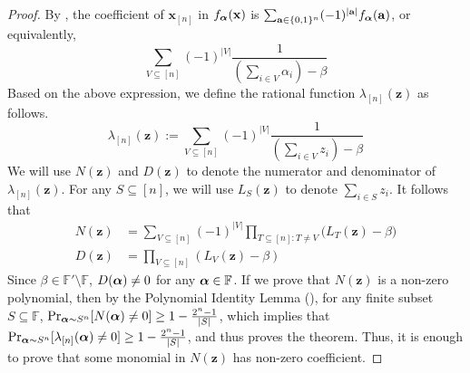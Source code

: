 \documentclass[11pt]{article}
\newcommand{\Boo}{\{0,1 \}}
\newcommand{\F}{\mathbb{F}}
\begin{document}
\begin{proof}
    By , the coefficient of $\mathbf{x}_{[n]}$ in $f_{\boldsymbol{\alpha}}(\mathbf{x})$ is $\sum_{\mathbf{a}\in\Boo^n} (-1)^{|\mathbf{a}|}f_{\bfalpha}(\mathbf{a})$, or equivalently, $$\sum_{V \subseteq [n]} (-1)^{|V|}{\frac{1}{(\sum_{i \in V}\alpha_i) - \beta}}$$
    Based on the above expression, we define the rational function $\lambda_{[n]}(\mathbf{z})$ as follows. 
    $$\lambda_{[n]}(\mathbf{z}) := \sum_{V \subseteq [n]} (-1)^{|V|}{\frac{1}{(\sum_{i \in V}z_i) - \beta}}$$
    We will use $N(\mathbf{z})$ and $D(\mathbf{z})$ to denote the numerator and denominator of $\lambda_{[n]}(\mathbf{z})$. For any $S\subseteq [n]$, we will use $L_S(\mathbf{z})$ to denote $\sum_{i \in S}z_i$. It follows that 
    \begin{align*}
        N(\mathbf{z}) &= \sum_{V\subseteq [n]}{(-1)^{|V|}\prod_{T\subseteq [n]: T \neq V}({L_T(\mathbf{z})-\beta}}) \\
        D(\mathbf{z}) &= \prod_{V \subseteq [n]}{(L_V(\mathbf{z})-\beta)}
    \end{align*}
    Since $\beta \in \F'\setminus \F$, $D(\boldsymbol{\alpha}) \neq 0$ for any $\bfalpha \in \F$. If we prove that $N(\mathbf{z})$ is a non-zero polynomial, then by the Polynomial Identity Lemma (), for any finite subset $S\subseteq \F$, $\Pr_{\boldsymbol{\alpha} \sim S^n}[N(\boldsymbol{\alpha}) \neq 0] \geq 1 - \frac{2^n - 1}{|S|}$, which implies that $\Pr_{\boldsymbol{\alpha} \sim S^n}[\lambda_{[n]}(\boldsymbol{\alpha}) \neq 0] \geq 1 - \frac{2^n - 1}{|S|}$, and thus proves the theorem. Thus, it is enough to prove that some monomial in $N(\mathbf{z})$ has non-zero coefficient.
    

\end{proof}
\end{document}
